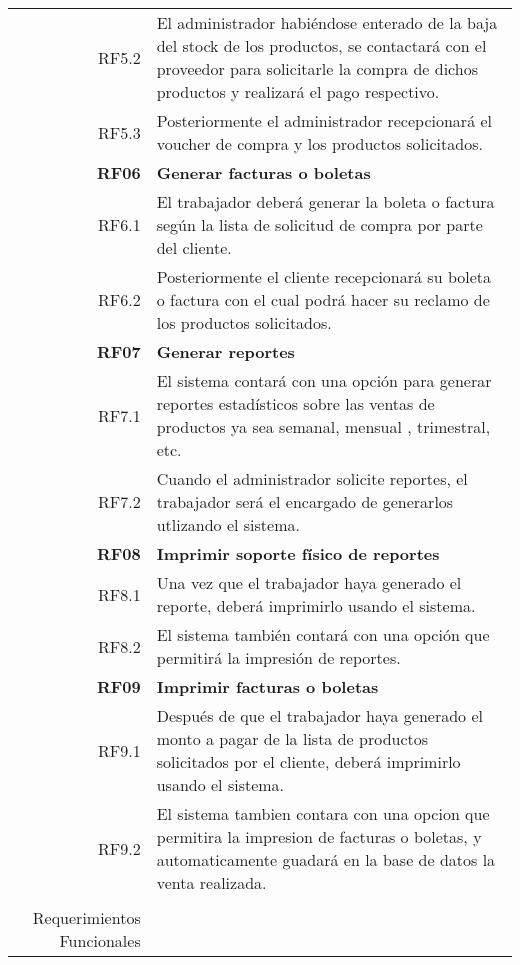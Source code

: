 \documentclass[a4paper,11pt, spanish]{report}
\begin{document}
{{{{{{{{{{{{\begin{longtable}{r|p{4.1in}}
      RF5.2 & El administrador habiéndose enterado de la baja del stock de los productos, se contactará con el proveedor para solicitarle la compra de dichos productos y realizará el pago respectivo. \\
      RF5.3 & Posteriormente el administrador recepcionará el voucher de compra y los productos solicitados.\\ \hline
      \textbf{\large RF06} & \textbf{\large Generar facturas o boletas}\\
      RF6.1 & El trabajador deberá generar la boleta o factura según la lista de solicitud de compra por parte del cliente.\\
      RF6.2 & Posteriormente el cliente recepcionará su boleta o factura con el cual podrá hacer su reclamo de los productos solicitados.\\ \hline 
      \textbf{\large RF07} & \textbf{\large Generar reportes }\\
      RF7.1 & El sistema contará con una opción para generar reportes estadísticos sobre las ventas de productos ya sea semanal, mensual , trimestral, etc.\\
      RF7.2 & Cuando el administrador solicite reportes, el trabajador será el encargado de generarlos utlizando el sistema.\\ \hline
      \textbf{\large RF08} & \textbf{\large Imprimir soporte físico de reportes} \\
      RF8.1 & Una vez que el trabajador haya generado el reporte, deberá imprimirlo usando el sistema.\\
      RF8.2 & El sistema también contará con una opción que permitirá la impresión de reportes.\\ \hline
      \textbf{\large RF09} & \textbf{\large Imprimir facturas o boletas} \\
      RF9.1 & Después de que el trabajador haya generado el monto a pagar de la lista de productos solicitados por el cliente, deberá imprimirlo usando el sistema.\\
      RF9.2 & El sistema tambien contara con una opcion que permitira la impresion de facturas o boletas, y automaticamente guadará en la base de datos la venta realizada.\\

    \caption{\\Requerimientos Funcionales}
    \end{longtable}
    
}}}}}}}}}}}}
\end{document}
